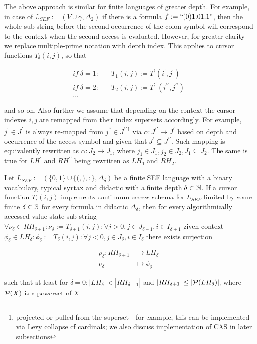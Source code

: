 The above approach is similar for finite languages of greater depth. For example, in case of $L_{SEF} := (V \cup \gamma, \Delta_2)$ if there is a formula $f := \text{``}(0)1{:}01{:}1\text{''}$, then the whole sub-string before the second occurrence of the colon symbol will correspond to the context when the second access is evaluated. However, for greater clarity we replace multiple-prime notation with depth index. This applies to cursor functions $T_\delta(i,j)$, so that

\begin{align*}
  if\:\delta = 1{:} & \quad T_{1}(i,j) := T^\prime(i^\prime,j^\prime)                            \\
  if\:\delta = 2{:} & \quad T_{2}(i,j) := T^{\prime \prime}(i^{\prime \prime},j^{\prime \prime}) \\
  ... {   }         &
\end{align*}

and so on. Also further we assume that depending on the context the cursor indexes $i, j$ are remapped from their index supersets accordingly. For example, $j^\prime \in J^\prime$  is always re-mapped from $j^{\prime \prime} \in J^{\prime \prime}$\footnote{projected or pulled from the superset - for example, this can be implemented via Levy collapse of cardinals\cite{jech2003set}; we also discuss implementation of CAS in later subsections} via $\alpha: J^{\prime \prime} \to J^\prime$ based on depth and occurrence of the access symbol and given that $J^\prime \subseteq J^{\prime \prime}$. Such mapping is equivalently rewritten as $\alpha: J_2 \to J_1$, where $j_1 \in J_1, j_2 \in J_2, J_1 \subseteq J_2$. The same is true for $LH^\prime$ and $RH^{\prime \prime}$ being rewritten as $LH_1$ and $RH_2$.

\begin{theorem}Let $L_{SEF} := (\{0,1\} \cup \{{(}, {)}, {:}\}, \Delta_\delta)$ be a finite SEF language with a binary vocabulary, typical syntax and didactic with a finite depth $\delta \in \mathbb{N}$. If a cursor function $T_\delta(i,j)$ implements continuum access schema for $L_{SEF}$ limited by some finite $\delta \in \mathbb{N}$ for every formula in didactic $\Delta_\delta$, then for every algorithmically accessed value-state sub-string $\forall \nu_\delta \in RH_{\delta+1}: \nu_\delta := T_{\delta+1}(i,j): \forall j > 0, j \in J_{\delta+1}, i \in I_{\delta+1}$ given context $\phi_\delta \in LH_\delta: \phi_\delta := T_\delta(i,j): \forall j < 0, j \in J_\delta, i \in I_\delta$ there exists surjection

  \begin{align*}
    \rho_\delta \colon RH_{\delta+1} & \to LH_\delta       \\
    \nu_\delta                       & \mapsto \phi_\delta
  \end{align*}

  such that at least for $\delta = 0: |LH_\delta| < |RH_{\delta+1}|$ and $|RH_{\delta+1}| \leq |\mathcal{P}(LH_\delta)|$, where $\mathcal{P}(X)$ is a powerset of $X$.\end{theorem}


